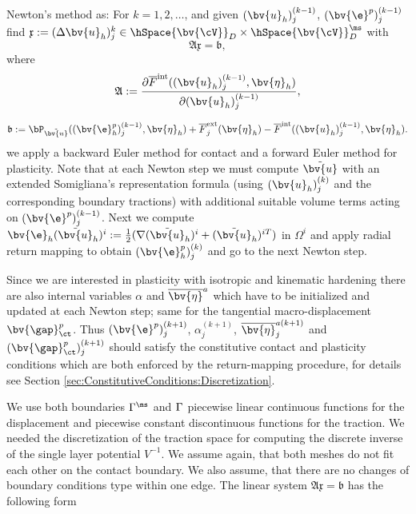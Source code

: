 Newton's method as: For $k=1,2,\ldots$, and given $(\bv{u}_h)_j^{(k-1)}$, $(\bv{\e}^p)_j^{(k-1)}$  find
${\mathfrak x}:=(\Delta\bv{u}_h)_j^{k}\in\hSpace{\bv{\cV}} ^{\sl}_D\times\hSpace{\bv{\cV}} ^{\ms}_D$ with
\begin{equation} \label{eq:Ax=b}
{\mathfrak A} {\mathfrak x} = {\mathfrak b},
\end{equation}
where
\[
{\mathfrak{A}}:=\frac{\partial \overline{F}^{\text{int}}((\bv{u}_h)_j^{(k-1)}, \bv{\eta} _h) }{\partial(\bv{u}_h)_j^{(k-1)}},
\]

\[
{\mathfrak{b}}:= \bP_{\tilde{\bv{u}}}((\bv{\e}_{h}^p)_j^{(k-1)},\bv{\eta}_h) + \overline{F}_j^{\text{ext}}(\bv{\eta} _h) -
\overline{F}^{\text{int}} ((\bv{u}_h)_j^{(k-1)},\bv{\eta} _h).
\]
we apply a backward Euler method for contact and a forward Euler
method for plasticity. Note that at each Newton step we must compute
$\tilde{\bv{u}}$ with an extended Somigliana's representation formula (using
$(\bv{u}_{h})_{j}^{(k)}$ and the corresponding boundary tractions) with additional
suitable volume terms acting on $(\bv{\e}^p)_j^{(k-1)}$. Next we compute
$\bv{\e}_{h}(\tilde{\bv{u}}_{h})^i:=\frac{1}{2}(\nabla (\tilde{\bv{u}}_{h})^i +(\tilde{\bv{u}}_{h})^{iT})$ in $\Omega^i$ and apply radial return mapping \cite{SiHu98}
to obtain $(\bv{\e}_{h}^p)_j^{(k)}$ and go to the next Newton step.

Since we are interested in plasticity with isotropic and kinematic
hardening \cite{SiHu98} there are also internal variables  $\alpha$ and $\overline{\bv{\eta}}^a$
which have to be initialized and updated at each Newton step; same for the
tangential macro-displacement $\bv{\gap}_{\ct}^p$. Thus $(\bv{\e}^p)_j^{(k+1)}$,
$\alpha_j^{(k+1)}$, $\overline{\bv{\eta}}_j^{a(k+1)}$ and $(\bv{\gap}_{\ct}^p)_j^{(k+1)}$
should satisfy the constitutive contact and plasticity conditions which are
both enforced by the return-mapping procedure, for details see
Section \ref{sec:ConstitutiveConditions:Discretization}.



We use both boundaries  $\Gamma^{\ms}$ and $\Gamma^{\sl}$  piecewise linear continuous functions for the displacement and piecewise constant discontinuous functions for the traction. We needed the discretization of the traction space for computing the discrete inverse of the single layer potential $V^{-1}$. We assume again,  that both meshes do not fit each other on the contact boundary. We also assume, that there are no changes of boundary conditions type within one edge.  The linear system $\mathfrak  A \mathfrak x = {\mathfrak b}$ has the following form

